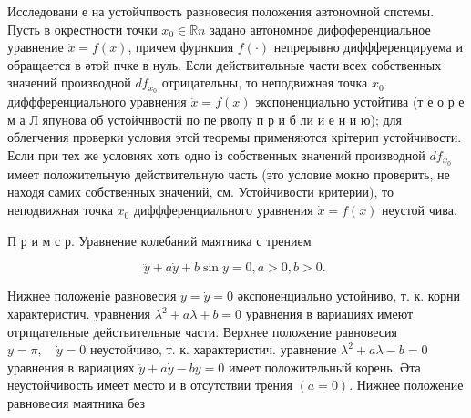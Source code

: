 \documentclass[10pt]{article}
\begin{document}
Исследовани е на устойчпвость равновесия положения автономной спстемы. Пусть в окрестности точки $x_{0} \in \mathbb{R} n$ задано автономное диффференциальное уравнение $\dot{x}=f(x)$, причем фурнкция $f(\cdot)$ непрерывно диффференцируема и обращается в әтой пчке в нуль. Если действитөльные части всех собственных значений производной $d f_{x_{0}}$ отрицательны, то неподвижная точка $x_{0}$ диффференциального уравнения $\dot{x}=f(x)$ экспоненциально устойтива (т е о р е м а Л япунова об устойчнвостй по пе рвопу п р и б ли и е н и ю); для облегчения проверки условия этсй теоремы применяются крітерип устойчивости. Если при тех же условиях хоть одно із собственных значений производной $d f_{x_{0}}$ имеет положительную действительную часть (это условие мокно проверить, не находя самих собственных значений, см. Устойчивости критерии), то неподвижная точка $x_{0}$ диффференциального уравнения $\dot{x}=f(x)$ неустой чива.



П р и м с р. Уравнение колебаний маятника с трением



\[

\ddot{y}+a \dot{y}+b \sin y=0, a>0, b>0 \text {. }

\]



Нижнее положеніе равновесия $y=\dot{y}=0$ әкспоненциально устоӥниво, т. к. корни характеристич. уравнения $\lambda^{2}+a \lambda+b=0$ уравнения в вариациях имеют отрпцательные действительные части. Верхнее положение равновесия $y=\pi, \quad \dot{y}=0$ неустойчиво, т. к. характеристич. уравнение $\lambda^{2}+a \lambda-b=0$ уравнения в вариациях $\ddot{y}+a \dot{y}-b y=0$ имеет положительный корень. Әта неустойчивость имеет место и в отсутствии трения $(a=0)$. Нижнее положение равновесия маятника без
\end{document}
